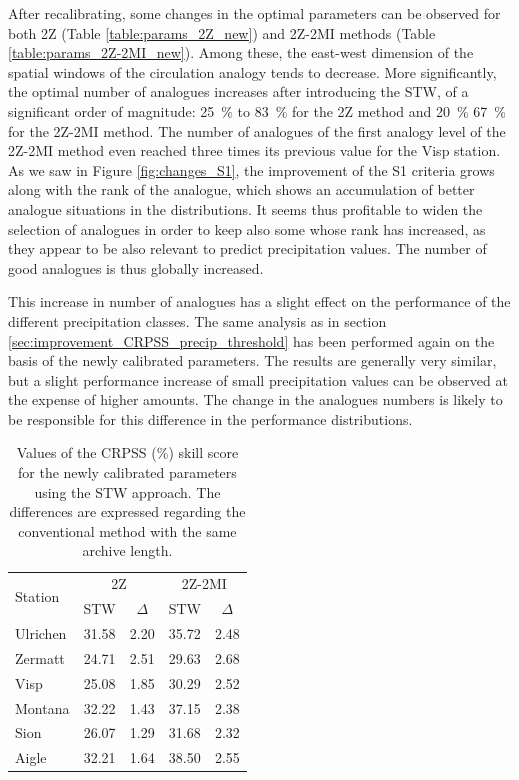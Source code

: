 \documentclass[hess]{copernicus}
\begin{document}
After recalibrating, some changes in the optimal parameters can be observed for both 2Z (Table \ref{table:params_2Z_new}) and 2Z-2MI methods (Table \ref{table:params_2Z-2MI_new}). Among these, the east-west dimension of the spatial windows of the circulation analogy tends to decrease. More significantly, the optimal number of analogues increases after introducing the STW, of a significant order of magnitude: 25~\% to 83~\% for the 2Z method and 20~\% 67~\% for the 2Z-2MI method. The number of analogues of the first analogy level of the 2Z-2MI method even reached three times its previous value for the Visp station. As we saw in Figure \ref{fig:changes_S1}, the improvement of the S1 criteria grows along with the rank of the analogue, which shows an accumulation of better analogue situations in the distributions. It seems thus profitable to widen the selection of analogues in order to keep also some whose rank has increased, as they appear to be also relevant to predict precipitation values. The number of good analogues is thus globally increased.

This increase in number of analogues has a slight effect on the performance of the different precipitation classes. The same analysis as in section \ref{sec:improvement_CRPSS_precip_threshold} has been performed again on the basis of the newly calibrated parameters. The results are generally very similar, but a slight performance increase of small precipitation values can be observed at the expense of higher amounts. The change in the analogues numbers is likely to be responsible for this difference in the performance distributions.

\begin{table}[htb]
	\caption{Values of the CRPSS (\%) skill score for the newly calibrated parameters using the STW approach. The differences are expressed regarding the conventional method with the same archive length.}
	\begin{center}
		\begin{tabular}{l c c c c}
			\hline
			\multirow{2}{*}{Station} & \multicolumn{2}{c}{2Z} & \multicolumn{ 2}{c}{2Z-2MI} \\
			& STW & $\Delta$ & STW & $\Delta$ \\
			\hline
			Ulrichen & 31.58 & 2.20 & 35.72 & 2.48  \\
			Zermatt & 24.71 & 2.51 & 29.63 & 2.68 \\
			Visp & 25.08 & 1.85 & 30.29 & 2.52 \\
			Montana & 32.22 & 1.43 & 37.15 & 2.38 \\
			Sion & 26.07 & 1.29 & 31.68 & 2.32 \\
			Aigle & 32.21 & 1.64 & 38.50 & 2.55 \\
			\hline
		\end{tabular}
	\end{center}
	\label{table:CRPSS_recalibration}
\end{table}
\end{document}
